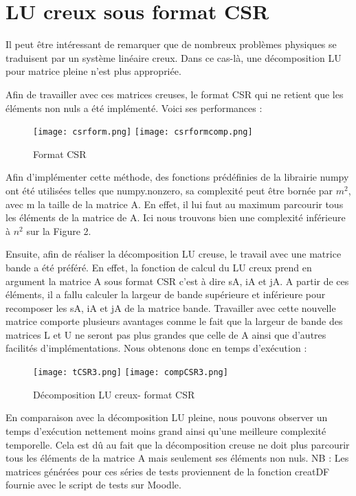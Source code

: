 \documentclass[11pt]{article}
\begin{document}
\section{LU creux sous format CSR}
Il peut être intéressant de remarquer que de nombreux problèmes physiques se traduisent par un système linéaire creux. Dans ce cas-là, une décomposition LU pour matrice pleine n'est plus appropriée. 

Afin de travailler avec ces matrices creuses, le format CSR qui ne retient que les éléments non nuls a été implémenté. Voici ses performances : 
\begin{figure}[h!]
    \centering
    \texttt{[image: csrform.png]}
    \texttt{[image: csrformcomp.png]}
    \caption{Format CSR}
\end{figure}
Afin d'implémenter cette méthode, des fonctions prédéfinies de la librairie numpy ont été utilisées telles que numpy.nonzero, sa complexité peut être bornée par $m^2$, avec m la taille de la matrice A. En effet, il lui faut au maximum parcourir tous les éléments de la matrice de A.
Ici nous trouvons bien une complexité inférieure à $n^2$ sur la Figure 2.

Ensuite, afin de réaliser la décomposition LU creuse, le travail avec une matrice bande a été préféré. En effet, la fonction de calcul du LU creux prend en argument la matrice A sous format CSR c'est à dire sA, iA et jA. A partir de ces éléments, il a fallu calculer la largeur de bande supérieure et inférieure pour recomposer les sA, iA et jA de la matrice bande. Travailler avec cette nouvelle matrice comporte plusieurs avantages comme le fait que la largeur de bande des matrices L et U ne seront pas plus grandes que celle de A ainsi que d'autres facilités d'implémentations. Nous obtenons donc en temps d'exécution :
\begin{figure}[h!]
    \centering
    \texttt{[image: tCSR3.png]}
    \texttt{[image: compCSR3.png]}
    \caption{Décomposition LU creux- format CSR}
\end{figure}

En comparaison avec la décomposition LU pleine, nous pouvons observer un temps d'exécution nettement moins grand ainsi qu'une meilleure complexité temporelle. Cela est dû au fait que la décomposition creuse ne doit plus parcourir tous les éléments de la matrice A mais seulement ses éléments non nuls.
NB : Les matrices générées pour ces séries de tests proviennent de la fonction creatDF fournie avec le script de tests sur Moodle.
\end{document}
